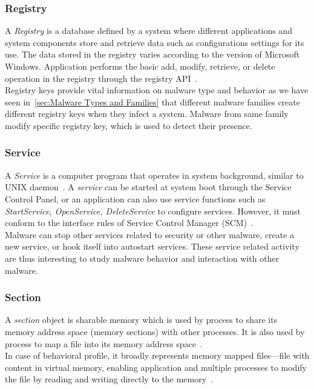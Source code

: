 \subsubsection{Registry}
\label{ssub:Registry}
A \emph{Registry} is a database defined by a system where different applications and system components store and retrieve data such as configurations settings for its use.
The data stored in the registry varies according to the version of Microsoft Windows.
Application performs the basic add, modify, retrieve, or delete operation in the registry through the registry API~\cite[]{msregistry}.\\
Registry keys provide vital information on malware type and behavior as we have seen in~\autoref{sec:Malware Types and Families} that different malware families create different registry keys when they infect a system.
Malware from same family modify specific registry key, which is used to detect their presence.
\subsubsection{Service}
\label{ssub:Service}
A \emph{Service} is a computer program that operates in system background, similar to UNIX daemon~\cite[]{servicedef}.
A \emph{service} can be started at system boot through the Service Control Panel, or an application can also use service functions such as \emph{StartService, OpenService, DeleteService} to configure services.
However, it must conform to the interface rules of Service Control Manager (SCM)~\cite[]{msservice}.\\
Malware can stop other services related to security or other malware, create a new service, or hook itself into autostart services.
These service related activity are thus interesting to study malware behavior and interaction with other malware.
\subsubsection{Section}
\label{ssub:Section}
A \emph{section} object is sharable memory which is used by process to share its memory address space (memory sections) with other processes.
It is also used by process to map a file into its memory address space~\cite[]{mssection}.\\
In case of behavioral profile, it broadly represents memory mapped files---file with content in virtual memory, enabling application and multiple processes to modify the file by reading and writing directly to the memory~\cite[]{memmapfile}.

